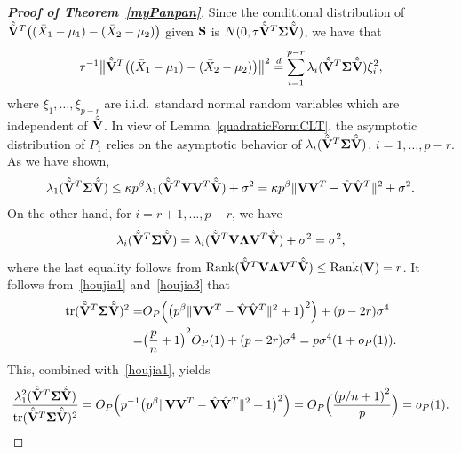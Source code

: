 \documentclass[3p]{elsarticle}
\DeclareMathOperator{\mytr}{tr}
\DeclareMathOperator{\myrank}{Rank}
\theoremstyle{plain}
\theoremstyle{definition}
\theoremstyle{remark}
\begin{document}
\begin{appendices}
\begin{proof}[\textbf{Proof of Theorem~\ref{myPanpan}}]
    Since the conditional distribution of
    $\hat{\tilde{\mathbf{V}}}^T\big((\bar{X}_1-\mu_1)-(\bar{X}_2-\mu_2)\big)$ given $\mathbf{S}$ is $N(0,\tau \hat{\tilde{\mathbf{V}}}^T\boldsymbol{\Sigma}\hat{\tilde{\mathbf{V}}})$,
    we have that
\begin{equation}\label{houjia2}
\tau^{-1}\big\|\hat{\tilde{\mathbf{V}}}^T\big((\bar{X}_1-\mu_1)-(\bar{X}_2-\mu_2)\big)\big\|^2
    \overset{d}{=}
    \sum_{i=1}^{p-r} \lambda_i(\hat{\tilde{\mathbf{V}}}^T\boldsymbol{\Sigma}\hat{\tilde{\mathbf{V}}})\xi_i^2,
\end{equation}
where $\xi_1,\ldots,\xi_{p-r}$ are i.i.d.\  standard normal random variables which are independent of $\hat{\tilde{\mathbf{V}}}$.
    In view of Lemma~\ref{quadraticFormCLT}, the asymptotic distribution of $P_1$ relies on the asymptotic behavior of $\lambda_i(\hat{\tilde{\mathbf{V}}}^T\boldsymbol{\Sigma}\hat{\tilde{\mathbf{V}}})$, $i=1,\ldots, p-r$.
    As we have shown,
     \begin{equation}\label{houjia1}
     \lambda_1(\hat{\tilde{\mathbf{V}}}^T\boldsymbol{\Sigma}\hat{\tilde{\mathbf{V}}})\leq 
     \kappa p^{\beta}\lambda_1(\hat{\tilde{\mathbf{V}}}^T \mathbf{V} \mathbf{V}^T\hat{\tilde{\mathbf{V}}})+\sigma^2
     =
    \kappa p^\beta \|\mathbf{V}\mathbf{V}^T -\hat{\mathbf{V}}\hat{\mathbf{V}}^T\|^2+\sigma^2.
     \end{equation}
    On the other hand,
    for $i=r+1,\ldots,p-r$,
    we have
    \begin{equation}\label{houjia3}
    \lambda_i(\hat{\tilde{\mathbf{V}}}^T\boldsymbol{\Sigma}\hat{\tilde{\mathbf{V}}})
    =
    \lambda_i(\hat{\tilde{\mathbf{V}}}^T \mathbf{V} \boldsymbol{\Lambda} \mathbf{V}^T \hat{\tilde{\mathbf{V}}})+\sigma^2
    =\sigma^2,
    \end{equation}
where the last equality follows from $\myrank(\hat{\tilde{\BV}}^T \BV \bLambda \BV^T \hat{\tilde{\BV}})\leq \myrank(\BV)=r$.
It follows from~\eqref{houjia1} and~\eqref{houjia3} that
\begin{equation}\label{traceA1}
    \begin{aligned}
        \mytr(\hat{\tilde{\BV}}^T\bSigma\hat{\tilde{\BV}})^2=&
    O_P\Big(\big(p^{\beta}\|\BV\BV^T-\hat{\BV}\hat{\BV}^T\|^2+1\big)^2\Big)
    +
    (p-2r)\sigma^4\\
    =&
    {\big(\frac{p}{n}+1\big)}^2O_P(1)
    +
    (p-2r)\sigma^4
    =p\sigma^4(1+o_P(1)).
    \end{aligned}
\end{equation}
This, combined with~\eqref{houjia1}, yields
$$
\frac{\lambda_1^2(\hat{\tilde{\BV}}^T\bSigma\hat{\tilde{\BV}})}{\mytr(\hat{\tilde{\BV}}^T\bSigma\hat{\tilde{\BV}})^2}
=O_P\Big(p^{-1}\big(p^{\beta}\|\BV\BV^T-\hat{\BV}\hat{\BV}^T\|^2+1\big)^2\Big)
        =O_P\Big(\frac{{(p/n+1)}^2}{p}\Big)=o_P(1).
$$
\end{proof}
\end{appendices}
\end{document}
